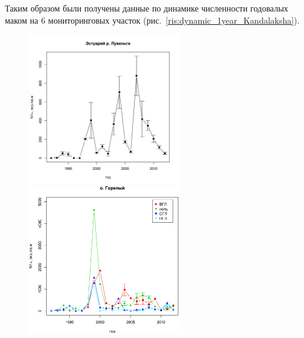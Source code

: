 Таким образом были получены данные по динамике численности годовалых маком на 6 мониторинговых участок (рис.~\ref{ris:dynamic_1year_Kandalaksha}).
	\begin{figure}[p]
	
	\begin{minipage}[b]{.46\linewidth}
	\begin{center}
	\includegraphics[width=65mm]{../White_Sea/Estuatiy_Luvenga/Estuary_N_oneyear1.pdf}

	\end{center}
	\end{minipage}
	\hfil %
	\begin{minipage}[b]{.46\linewidth}
	\begin{center}
		\includegraphics[width=65mm]{../White_Sea/Luvenga_Goreliy/Goreliy_N_oneyear1.pdf}
	\end{center}
	\end{minipage}




\end{figure}
